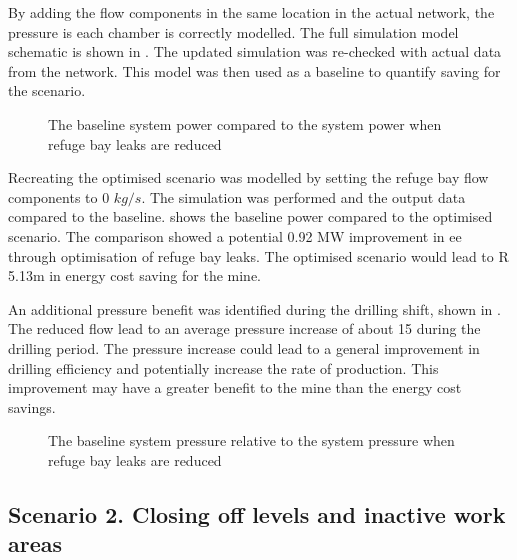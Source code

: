 	By adding the flow components in the same location in the actual network, the pressure is each chamber is correctly modelled. The full simulation model schematic is shown in . The updated simulation was re-checked with actual data from the network. This model was then used as a baseline to quantify saving for the scenario.
	\par 
	\begin{figure}[h!]
		\centering
		
		\caption{The baseline system power compared to the system power when refuge bay leaks are reduced}
		\label{fig: RefugeBay Power.}
	\end{figure} 
	Recreating the optimised scenario was modelled by setting the refuge bay flow components to 0 $kg/s$. The simulation was performed and the output data compared to the baseline.  shows the baseline power compared to the optimised scenario. The comparison showed a potential 0.92 MW improvement in \gls{ee} through optimisation of refuge bay leaks. The optimised scenario would lead to R 5.13m in energy cost saving for the mine.
	\par
	An additional pressure benefit was identified during the drilling shift, shown in . The reduced flow lead to an average pressure increase of about 15  during the drilling period. The pressure increase could lead to a general improvement in drilling efficiency and potentially increase the rate of production. This improvement may have a greater benefit to the mine than the energy cost savings.
	\begin{figure}[h!]
		\centering
		
		\caption{The baseline system pressure relative to the system pressure when refuge bay leaks are reduced}
		\label{fig: RefugeBay Pressures.}
	\end{figure} 
	\subsection{Scenario 2. Closing off levels and inactive work areas}
